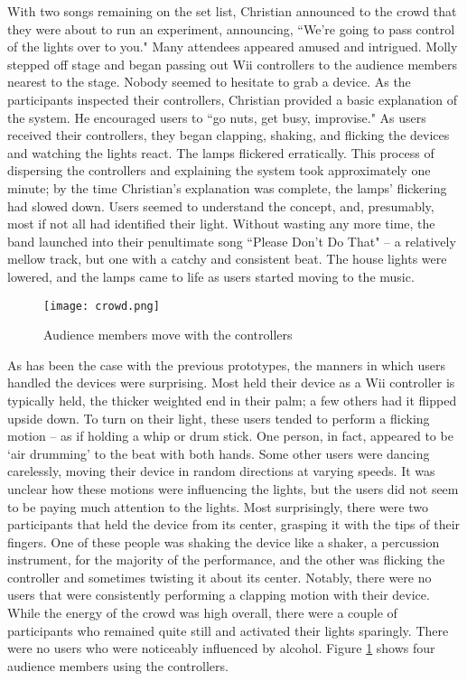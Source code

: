 With two songs remaining on the set list, Christian announced to the crowd that they were about to run an experiment, announcing, ``We're going to pass control of the lights over to you." Many attendees appeared amused and intrigued. Molly stepped off stage and began passing out Wii controllers to the audience members nearest to the stage. Nobody seemed to hesitate to grab a device. As the participants inspected their controllers, Christian provided a basic explanation of the system. He encouraged users to ``go nuts, get busy, improvise." As users received their controllers, they began clapping, shaking, and flicking the devices and watching the lights react. The lamps flickered erratically. This process of dispersing the controllers and explaining the system took approximately one minute; by the time Christian's explanation was complete, the lamps' flickering had slowed down. Users seemed to understand the concept, and, presumably, most if not all had identified their light. Without wasting any more time, the band launched into their penultimate song ``Please Don't Do That" -- a relatively mellow track, but one with a catchy and consistent beat. The house lights were lowered, and the lamps came to life as users started moving to the music.

\begin{figure}
	\centering

	\texttt{[image: crowd.png]}
	\caption{Audience members move with the controllers}

	\label{prototyping3.11}
\end{figure}

As has been the case with the previous prototypes, the manners in which users handled the devices were surprising. Most held their device as a Wii controller is typically held, the thicker weighted end in their palm; a few others had it flipped upside down. To turn on their light, these users tended to perform a flicking motion -- as if holding a whip or drum stick. One person, in fact, appeared to be `air drumming' to the beat with both hands. Some other users were dancing carelessly, moving their device in random directions at varying speeds. It was unclear how these motions were influencing the lights, but the users did not seem to be paying much attention to the lights. Most surprisingly, there were two participants that held the device from its center, grasping it with the tips of their fingers. One of these people was shaking the device like a shaker, a percussion instrument, for the majority of the performance, and the other was flicking the controller and sometimes twisting it about its center. Notably, there were no users that were consistently performing a clapping motion with their device. While the energy of the crowd was high overall, there were a couple of participants who remained quite still and activated their lights sparingly. There were no users who were noticeably influenced by alcohol. Figure \ref{prototyping3.11} shows four audience members using the controllers.

